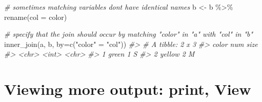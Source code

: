 \documentclass[
]{book}
\newenvironment{Shaded}{\begin{snugshade}}{\end{snugshade}}
\newcommand{\AttributeTok}[1]{\textcolor[rgb]{0.77,0.63,0.00}{#1}}
\newcommand{\CommentTok}[1]{\textcolor[rgb]{0.56,0.35,0.01}{\textit{#1}}}
\newcommand{\FunctionTok}[1]{\textcolor[rgb]{0.00,0.00,0.00}{#1}}
\newcommand{\NormalTok}[1]{#1}
\newcommand{\OtherTok}[1]{\textcolor[rgb]{0.56,0.35,0.01}{#1}}
\newcommand{\SpecialCharTok}[1]{\textcolor[rgb]{0.00,0.00,0.00}{#1}}
\newcommand{\StringTok}[1]{\textcolor[rgb]{0.31,0.60,0.02}{#1}}
\begin{document}
\begin{Shaded}
\begin{Highlighting}[]
\CommentTok{\# sometimes matching variables don\textquotesingle{}t have identical names}
\NormalTok{b }\OtherTok{\textless{}{-}}\NormalTok{ b }\SpecialCharTok{\%\textgreater{}\%} \FunctionTok{rename}\NormalTok{(}\AttributeTok{col =}\NormalTok{ color)}

\CommentTok{\# specify that the join should occur by matching "color" in "a" with "col" in "b"}
\FunctionTok{inner\_join}\NormalTok{(a, b, }\AttributeTok{by=}\FunctionTok{c}\NormalTok{(}\StringTok{"color"} \OtherTok{=} \StringTok{"col"}\NormalTok{))}
\CommentTok{\#\textgreater{} \# A tibble: 2 x 3}
\CommentTok{\#\textgreater{}   color    num size }
\CommentTok{\#\textgreater{}   \textless{}chr\textgreater{}  \textless{}int\textgreater{} \textless{}chr\textgreater{}}
\CommentTok{\#\textgreater{} 1 green      1 S    }
\CommentTok{\#\textgreater{} 2 yellow     2 M}
\end{Highlighting}
\end{Shaded}

\hypertarget{viewing-more-output-print-view}{%
\section{Viewing more output: print, View}\label{viewing-more-output-print-view}}
\end{document}
